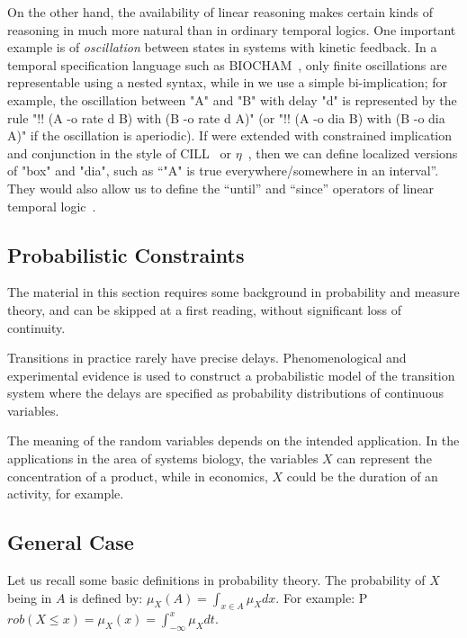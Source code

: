 \documentclass{article}
\begin{document}
On the other hand, the availability of linear reasoning makes certain kinds
of reasoning in \hyll much more natural than in ordinary temporal
logics. One important example is of \emph{oscillation} between states in
systems with kinetic feedback. In a temporal specification language such as
BIOCHAM~\cite{chabrier05cmsb}, only finite oscillations are representable
using a nested syntax, while in \hyll we use a simple bi-implication; for
example, the oscillation between "A" and "B" with delay "d" is represented
by the rule "!!  (A -o rate d B) with (B -o rate d A)" (or "!! (A -o dia B)
with (B -o dia A)" if the oscillation is aperiodic).
If \hyllt were extended with constrained implication and conjunction in the
style of CILL~\cite{saranli07icra} or $\eta$~\cite{deyoung08csf}, then we can
define localized versions of "box" and "dia", such as ``"A" is true
everywhere/somewhere in an interval''. They would also allow us to define the
``until'' and ``since'' operators of linear temporal logic~\cite{kamp68phd}.

\subsection{Probabilistic Constraints}
\label{sec:hyllp}

The material in this section requires some background in probability and measure theory,
and can be skipped at a first reading, without significant loss of continuity.

Transitions in practice rarely have precise delays. Phenomenological and
experimental evidence is used to construct a probabilistic model of the
transition system where the delays are specified as probability distributions of
continuous variables. 

The meaning of the random variables depends on the intended application.
In the applications in the area of systems biology, 
the variables $X$ can represent the concentration of a product, 
while in economics, $X$ could be the duration of an activity, for example.


\subsection{General Case}

Let us recall some basic definitions in probability theory.
The probability of $X$ being in $A$ is defined by:
$\mu_{X}(A) = \int_{x \in A} \mu_X dx$.
For example:
P${rob}(X \le x)= \mu_{X}(x) = \int_{-\infty}^{x} \mu_X dt$.
\end{document}
